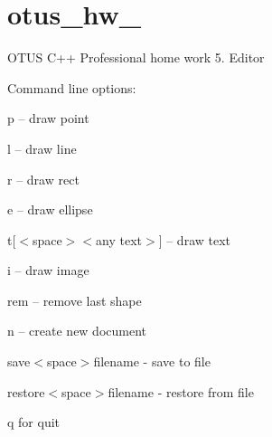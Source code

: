\chapter{otus\+\_\+hw\+\_}
\hypertarget{md__r_e_a_d_m_e}{}\label{md__r_e_a_d_m_e}
\label{md__r_e_a_d_m_e_autotoc_md0}%
%


OTUS C++ Professional home work 5. Editor

Command line options\+:
\begin{DoxyItemize}
\item \textquotesingle{}p\textquotesingle{} – draw point
\item \textquotesingle{}l\textquotesingle{} – draw line
\item \textquotesingle{}r\textquotesingle{} – draw rect
\item \textquotesingle{}e\textquotesingle{} – draw ellipse
\item \textquotesingle{}t\textquotesingle{}\mbox{[}$<$space$>$$<$any text$>$\mbox{]} – draw text
\item \textquotesingle{}i\textquotesingle{} – draw image
\item \textquotesingle{}rem\textquotesingle{} – remove last shape
\item \textquotesingle{}n\textquotesingle{} – create new document
\item \textquotesingle{}save\textquotesingle{}$<$space$>$\textquotesingle{}filename\textquotesingle{} -\/ save to file
\item \textquotesingle{}restore\textquotesingle{}$<$space$>$\textquotesingle{}filename\textquotesingle{} -\/ restore from file
\item \textquotesingle{}q\textquotesingle{} for quit 
\end{DoxyItemize}
